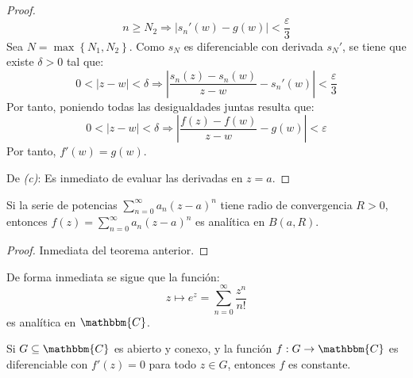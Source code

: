 \documentclass[12pt]{report}
\newcounter{it}
\theoremstyle{largebreak}
\newcommand\abs[1]{\ensuremath{\left|#1\right|}}
\newcommand\cf[3]{\ensuremath{#1:#2\rightarrow#3}}
\newcommand{\bbm}[1]{\ensuremath{\mathbbm{#1}}}
\begin{document}
\begin{proof}
        \begin{equation*}
            n\geq N_2\Rightarrow \abs{s_n'(w)-g(w)}<\frac{\varepsilon}{3}
        \end{equation*}
        Sea $N=\max\left\{N_1,N_2 \right\}$. Como $s_N$ es diferenciable con derivada $s_N'$, se tiene que existe $\delta>0$ tal que:
        \begin{equation*}
            0<\abs{z-w}<\delta\Rightarrow \abs{\frac{s_n(z)-s_n(w)}{z-w}-s_n'(w)}<\frac{\varepsilon}{3}
        \end{equation*}
        Por tanto, poniendo todas las desigualdades juntas resulta que:
        \begin{equation*}
            0<\abs{z-w}<\delta\Rightarrow\abs{\frac{f(z)-f(w)}{z-w}-g(w)}<\varepsilon
        \end{equation*}
        Por tanto, $f'(w)=g(w)$.

        De \textit{(c)}: Es inmediato de evaluar las derivadas en $z=a$.
    \end{proof}

    \begin{cor}
        Si la serie de potencias $\sum_{ n=0}^\infty a_n(z-a)^n$ tiene radio de convergencia $R>0$, entonces $f(z)=\sum_{ n=0}^\infty a_n(z-a)^n$ es analítica en $B(a,R)$.
    \end{cor}

    \begin{proof}
        Inmediata del teorema anterior.
    \end{proof}

    De forma inmediata se sigue que la función:
    \begin{equation*}
        z\mapsto e^z=\sum_{ n=0}^\infty\frac{z^n}{n!}
    \end{equation*}
    es analítica en $\bbm{C}$.

    \begin{propo}
        Si $G\subseteq\bbm{C}$ es abierto y conexo, y la función $\cf{f}{G}{\bbm{C}}$ es diferenciable con $f'(z)=0$ para todo $z\in G$, entonces $f$ es constante.
    \end{propo}
\end{document}

